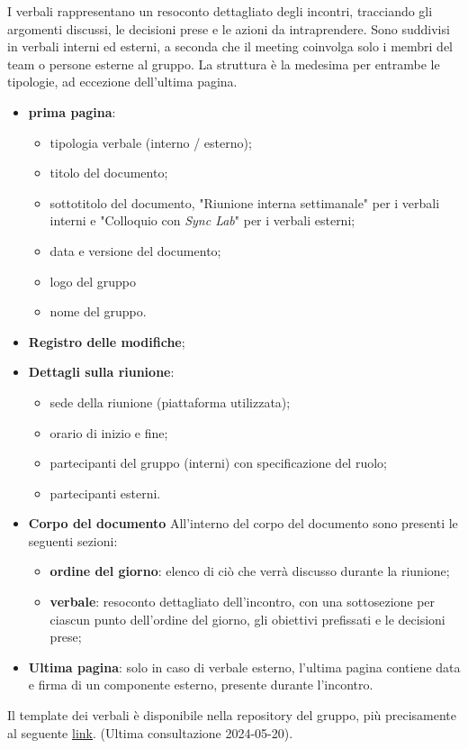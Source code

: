 I verbali rappresentano un resoconto dettagliato degli incontri, tracciando gli argomenti discussi, le decisioni prese e le azioni da intraprendere.
Sono suddivisi in verbali interni ed esterni, a seconda che il meeting coinvolga solo i membri del team o persone esterne al gruppo.
La struttura è la medesima per entrambe le tipologie, ad eccezione dell'ultima pagina.
\begin{itemize}
	\item \textbf{prima pagina}:
	      \begin{itemize}
		      \item tipologia verbale (interno / esterno);
		      \item titolo del documento;
		      \item sottotitolo del documento, "Riunione interna settimanale" per i verbali interni e "Colloquio con \textit{Sync Lab}" per i verbali esterni;
		      \item data e versione del documento;
		      \item logo del gruppo
		      \item nome del gruppo.
	      \end{itemize}
	\item \textbf{Registro delle modifiche};
	\item \textbf{Dettagli sulla riunione}:
	      \begin{itemize}
		      \item sede della riunione (piattaforma utilizzata);
		      \item orario di inizio e fine;
		      \item partecipanti del gruppo (interni) con specificazione del ruolo;
		      \item partecipanti esterni.
	      \end{itemize}
	\item \textbf{Corpo del documento}
	      All'interno del corpo del documento sono presenti le seguenti sezioni:
	      \begin{itemize}
		      \item \textbf{ordine del giorno}: elenco di ciò che verrà discusso durante la riunione;
		      \item \textbf{verbale}: resoconto dettagliato dell'incontro, con una sottosezione per ciascun punto dell'ordine del giorno,
		            gli obiettivi prefissati e le decisioni prese;
	      \end{itemize}
	\item \textbf{Ultima pagina}: solo in caso di verbale esterno, l'ultima pagina contiene data e firma di un componente esterno, presente durante l'incontro.
\end{itemize}
Il template dei verbali è disponibile nella repository del gruppo, più precisamente al seguente \href{https://github.com/7Last/docs/tree/develop/0_template}{\underline{link}}. (Ultima consultazione 2024-05-20).
\newpage
